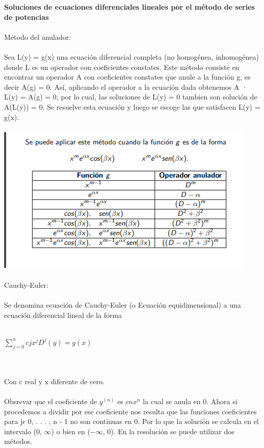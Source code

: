 \documentclass[a4paper,10pt]{article}
\begin{document}
{\newpage
\textbf{Soluciones de ecuaciones diferenciales lineales por el método de series de potencias}\\\\
Método del anulador:\\\\
Sea L(y) = g(x) una ecuación diferencial completa (no
homogénea, inhomogénea) donde L es un operador con
coeficientes constates. Este método consiste en encontrar un
operador A con coeficientes constates que anule a la función g, es
decir A(g) = 0. Así, aplicando el operador a la ecuación dada
obtenemos A · L(y) = A(g) = 0, por lo cual, las soluciones de
L(y) = 0 tambien son solución de A(L(y)) = 0. Se resuelve esta
ecuación y luego se escoge las que satisfacen L(y) = g(x).\\\\
\includegraphics[scale=1]{Anulador.png} \\\\
Cauchy-Euler:\\\\
Se denomina ecuación de Cauchy-Euler (o Ecuación
equidimensional) a una ecuación diferencial lineal de la forma\\\\
\centerline{ $\sum_{j=0}^{n} cj x^j  D^j (y) = g(x)$}\\\\
Con c real y x diferente de cero.\\\\
Obsrevar que el coeficiente de $y^(n)$ es $cnx^n$
la cual se anula en 0. Ahora si procedemos a dividir por ese coeficiente nos resulta que las funciones coeficientes para j$ \epsilon$ {0, . . . , n - 1} no son continuas
en 0. Por lo que la solución se calcula en el intervalo (0, $\infty
$) o bien
en ($-\infty$, 0). En la resolución se puede utilizar dos métodos.\\\\
}
\end{document}
